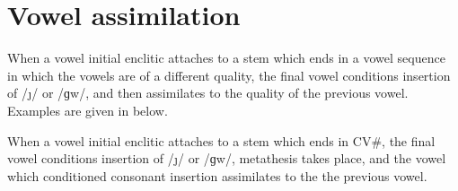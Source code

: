 \section{Vowel assimilation}\label{sec:VowAss ch:PhoMet}
When a vowel initial enclitic attaches to a stem which ends in a vowel sequence
in which the vowels are of a different quality,
the final vowel conditions insertion of /\j/ or /ɡw/,
and then assimilates to the quality of the previous vowel.
Examples are given in  below.

\begin{exe}
	\label{ex:VaVb+=V->VaVaCb=V}
\end{exe}

When a vowel initial enclitic attaches to a stem which ends in CV{\#},
the final vowel conditions insertion of /\j/ or /ɡw/,
metathesis takes place, and the vowel which conditioned consonant
insertion assimilates to the the previous vowel.

